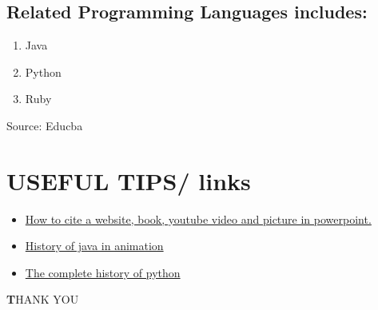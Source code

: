 \documentclass{article}
\begin{document}
\subsection{Related Programming Languages includes:}
\begin{enumerate}
	\item Java
	\item Python
	\item Ruby
\end{enumerate}
Source: Educba
\section{USEFUL TIPS/ links}
\begin{itemize}
	\item \href{https://youtu.be/PzmNb5HXbZ8}{How to cite a website, book, youtube video and picture in powerpoint.}
	\item \href{https://youtu.be/KFIR4nwZqp8}{History of java in animation}
	\item \href{https://youtu.be/Kn3-8Nq2Ddo}{The complete history of python}
\end{itemize}
\newpage
\textbf THANK YOU
\end{document}
